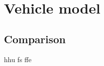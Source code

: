 \documentclass[main_adjusted]{subfiles}
\begin{document}
\chapter{Vehicle model}
\label{cha:comfort features}

\section{Comparison}
\label{Different comfort features found in literature}
hhu
fs ffe 
\end{document}
